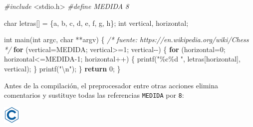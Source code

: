 \documentclass[
]{book}
\newenvironment{Shaded}{\begin{snugshade}}{\end{snugshade}}
\newcommand{\CharTok}[1]{\textcolor[rgb]{0.31,0.60,0.02}{#1}}
\newcommand{\CommentTok}[1]{\textcolor[rgb]{0.56,0.35,0.01}{\textit{#1}}}
\newcommand{\ControlFlowTok}[1]{\textcolor[rgb]{0.13,0.29,0.53}{\textbf{#1}}}
\newcommand{\DataTypeTok}[1]{\textcolor[rgb]{0.13,0.29,0.53}{#1}}
\newcommand{\DecValTok}[1]{\textcolor[rgb]{0.00,0.00,0.81}{#1}}
\newcommand{\ImportTok}[1]{#1}
\newcommand{\NormalTok}[1]{#1}
\newcommand{\PreprocessorTok}[1]{\textcolor[rgb]{0.56,0.35,0.01}{\textit{#1}}}
\newcommand{\SpecialCharTok}[1]{\textcolor[rgb]{0.00,0.00,0.00}{#1}}
\newcommand{\StringTok}[1]{\textcolor[rgb]{0.31,0.60,0.02}{#1}}
\begin{document}
\begin{Shaded}
\begin{Highlighting}[]
\PreprocessorTok{\#include }\ImportTok{\textless{}stdio.h\textgreater{}}
\PreprocessorTok{\#define MEDIDA 8}

\DataTypeTok{char}\NormalTok{ letras[] = \{}\CharTok{\textquotesingle{}a\textquotesingle{}}\NormalTok{, }\CharTok{\textquotesingle{}b\textquotesingle{}}\NormalTok{, }\CharTok{\textquotesingle{}c\textquotesingle{}}\NormalTok{, }\CharTok{\textquotesingle{}d\textquotesingle{}}\NormalTok{, }\CharTok{\textquotesingle{}e\textquotesingle{}}\NormalTok{, }\CharTok{\textquotesingle{}f\textquotesingle{}}\NormalTok{, }\CharTok{\textquotesingle{}g\textquotesingle{}}\NormalTok{, }\CharTok{\textquotesingle{}h\textquotesingle{}}\NormalTok{\};}
\DataTypeTok{int}\NormalTok{ vertical, horizontal;}

\DataTypeTok{int}\NormalTok{ main(}\DataTypeTok{int}\NormalTok{ argc, }\DataTypeTok{char}\NormalTok{ **argv) \{}
    \CommentTok{/* fuente: https://en.wikipedia.org/wiki/Chess */}
    \ControlFlowTok{for}\NormalTok{ (vertical=MEDIDA; vertical\textgreater{}=}\DecValTok{1}\NormalTok{; vertical{-}{-}) \{}
        \ControlFlowTok{for}\NormalTok{ (horizontal=}\DecValTok{0}\NormalTok{; horizontal\textless{}=MEDIDA{-}}\DecValTok{1}\NormalTok{; horizontal++) \{}
\NormalTok{            printf(}\StringTok{"\%c\%d "}\NormalTok{, letras[horizontal], vertical);}
\NormalTok{        \}}
\NormalTok{        printf(}\StringTok{"}\SpecialCharTok{\textbackslash{}n}\StringTok{"}\NormalTok{);}
\NormalTok{    \}}
    \ControlFlowTok{return} \DecValTok{0}\NormalTok{;}
\NormalTok{\}}
\end{Highlighting}
\end{Shaded}

Antes de la compilación, el preprocesador entre otras acciones elimina comentarios y sustituye todas las referencias \texttt{MEDIDA} por \texttt{8}:

\includegraphics{./img/c.png}
\end{document}
